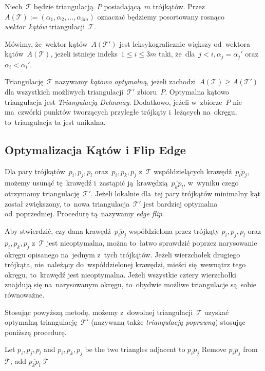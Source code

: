 \documentclass[skorowidz,autorrok,backref,xodstep,oswiadczenie]{wmimgr}
\begin{document}
Niech~$\mathcal{T}$ będzie triangulacją~$P$ posiadającą~$m$ trójkątów. Przez~$A(\mathcal{T}) := (\alpha_{1}, \alpha_{2}, ..., \alpha_{3m})$ oznaczać będziemy posortowany rosnąco \emph{wektor~kątów} triangulacji~$\mathcal{T}$.

Mówimy, że~wektor kątów~$A(\mathcal{T'})$ jest leksykograficznie większy od~wektora kątów~$A(\mathcal{T})$, jeżeli istnieje indeks~$1 \leq i \leq 3m$ taki, że~dla~$j < i, \alpha_{j} = \alpha_{j}'$ oraz~$\alpha_{i} < \alpha_{i}'$.

Triangulację~$\mathcal{T}$ nazywamy \emph{kątowo optymalną}, jeżeli zachodzi~$A(\mathcal{T}) \geq A(\mathcal{T'})$ dla wszystkich możliwych triangulacji~$\mathcal{T'}$ zbioru~$P$. Optymalna kątowo triangulacja jest \emph{Triangulacją Delaunay}. Dodatkowo, jeżeli w~zbiorze~$P$ nie ma~czwórki punktów tworzących przyległe trójkąty i~leżących na~okręgu, to~triangulacja ta jest unikalna.

\subsection{Optymalizacja Kątów i Flip Edge}

Dla pary trójkątów~$p_{i}, p_{j}, p_{l}$ oraz~$p_{i}, p_{k}, p_{j}$ z~$\mathcal{T}$ współdzielących krawędź~$\overline{p_{i} p_{j}}$, możemy usunąć tę~krawędź i~zastąpić ją~krawędzią~$\overline{p_{k} p_{l}}$, w~wyniku czego otrzymamy triangulację~$\mathcal{T'}$. Jeżeli lokalnie dla~tej pary trójkątów minimalny kąt został zwiększony, to~nowa triangulacja~$\mathcal{T'}$ jest bardziej optymalna od~poprzedniej. Procedurę tą~nazywamy \emph{edge flip}.

Aby stwierdzić, czy dana krawędź~$\overline{p_{i} p_{j}}$ współdzielona przez trójkąty $p_{i}, p_{j}, p_{l}$ oraz $p_{i}, p_{k}, p_{j}$ z~$\mathcal{T}$ jest nieoptymalna, można to~łatwo sprawdzić poprzez narysowanie okręgu opisanego na~jednym z~tych trójkątów. Jeżeli wierzchołek drugiego trójkąta, nie~należący do~współdzielonej krawędzi, mieści się~wewnątrz tego okręgu, to~krawędź jest nieoptymalna. Jeżeli wszystkie cztery wierzchołki znajdują się na~narysowanym okręgu, to~obydwie możliwe triangulacje są~sobie równoważne.

Stosując powyższą metodę, możemy z~dowolnej triangulacji~$\mathcal{T}$ uzyskać optymalną triangulację~$\mathcal{T'}$ (nazywaną także \emph{triangulacją poprawną}) stosując poniższą procedurę.

\begin{algorithm}
\caption{$LegalTriangulation(\mathcal{T})$ \cite{geometria}}
\label{LegalTriangulation}
\begin{algorithmic}
        \STATE Let $p_{i}, p_{j}, p_{l}$ and $p_{i}, p_{k}, p_{j}$ be the two triangles adjacent to $\overline{p_{i} p_{j}}$
        \STATE Remove $\overline{p_{i} p_{j}}$ from $\mathcal{T}$, add $\overline{p_{k} p_{l}}$
    \ENDWHILE
    \RETURN $\mathcal{T}$
\end{algorithmic}
\end{algorithm}
\end{document}
